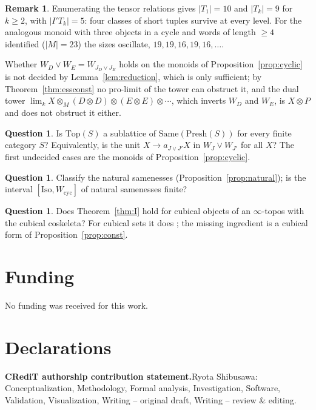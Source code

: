 \documentclass[11pt]{amsart}
\theoremstyle{definition}
\newtheorem{rem}[thm]{Remark}
\newtheorem{que}[thm]{Question}
\newcommand{\Same}{\mathrm{Same}}
\newcommand{\Top}{\mathrm{Top}}
\newcommand{\Iso}{\mathrm{Iso}}
\newcommand{\Presh}{\mathrm{Presh}}
\newcommand{\Wcyc}{W_{\mathrm{cyc}}}
\begin{document}
\begin{rem}
Enumerating the tensor relations gives $|T_1|=10$ and $|T_k|=9$ for $k\ge2$,
with $|I'T_k|=5$: four classes of short tuples survive at every level. For the
analogous monoid with three objects in a cycle and words of length $\ge4$
identified ($|M|=23$) the sizes oscillate, $19,19,16,19,16,\dots$.
\end{rem}

Whether $W_D\vee W_E=W_{J_D\vee J_E}$ holds on the monoids of
Proposition~\ref{prop:cyclic} is not decided by Lemma~\ref{lem:reduction}, which
is only sufficient; by Theorem~\ref{thm:essconst} no pro-limit of the tower can
obstruct it, and the dual tower $\lim_kX\otimes_M(D\otimes D)\otimes(E\otimes E)\otimes\cdots$,
which inverts $W_D$ and $W_E$, is $X\otimes P$ and does not obstruct it either.

\begin{que}\label{que:finite}
Is $\Top(S)$ a sublattice of $\Same(\Presh(S))$ for every finite category $S$?
Equivalently, is the unit $X\to a_{J\vee J'}X$ in $W_J\vee W_{J'}$ for all $X$?
The first undecided cases are the monoids of Proposition~\ref{prop:cyclic}.
\end{que}

\begin{que}
Classify the natural samenesses (Proposition~\ref{prop:natural}); is the
interval $[\Iso,\Wcyc]$ of natural samenesses finite?
\end{que}

\begin{que}
Does Theorem~\ref{thm:I} hold for cubical objects of an $\infty$-topos with the
cubical coskeleta? For cubical sets it does \cite{Postnikov}; the missing
ingredient is a cubical form of Proposition~\ref{prop:const}.
\end{que}

\section*{Funding}
No funding was received for this work.

\section*{Declarations}
\noindent\textbf{CRediT authorship contribution statement.}\quad Ryota Shibusawa:
Conceptualization, Methodology, Formal analysis, Investigation, Software,
Validation, Visualization, Writing -- original draft, Writing -- review \& editing.
\end{document}
